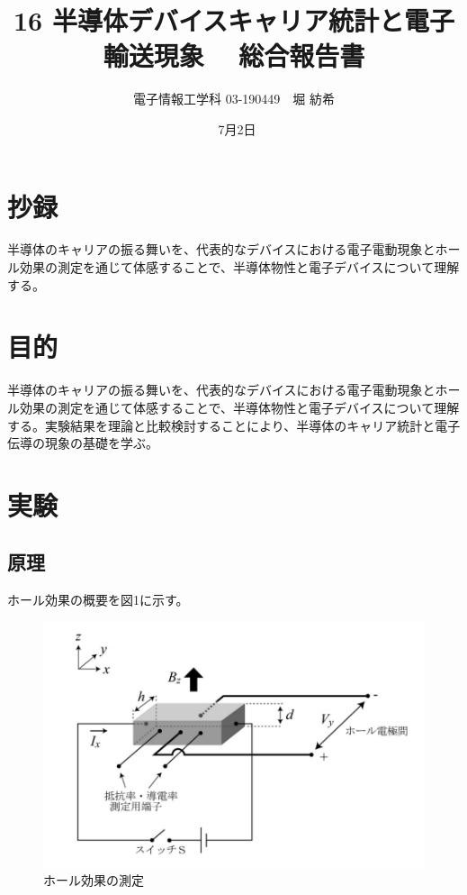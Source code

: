 \documentclass[dvipdfmx]{jsarticle}
\begin{document}
\title{16 半導体デバイスキャリア統計と電子輸送現象　 総合報告書}
\author{電子情報工学科 03-190449　堀 紡希}
\date{\ 7月2日}
\maketitle


\section{抄録}
半導体のキャリアの振る舞いを、代表的なデバイスにおける電子電動現象とホール効果の測定を通じて体感することで、半導体物性と電子デバイスについて理解する。
\section{目的}
半導体のキャリアの振る舞いを、代表的なデバイスにおける電子電動現象とホール効果の測定を通じて体感することで、半導体物性と電子デバイスについて理解する。実験結果を理論と比較検討することにより、半導体のキャリア統計と電子伝導の現象の基礎を学ぶ。
\section{実験}

\subsection{原理}
ホール効果の概要を図1に示す。
\begin{figure}[H]
\begin{center}
\includegraphics[scale = 0.6]{figure1.png}
\caption{ホール効果の測定}
\end{center}
\end{figure}
\end{document}
